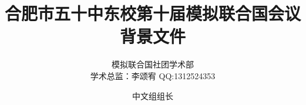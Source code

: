 \documentclass{article}
\title{合肥市五十中东校第十届模拟联合国会议\\\huge 背景文件}
\author{模拟联合国社团学术部 \\ 学术总监：李颂宥 QQ:1312524353 \and 中文组组长}
\begin{document}
    \centering
    \maketitle
    \clearpage
    \tableofcontents
\end{document}
